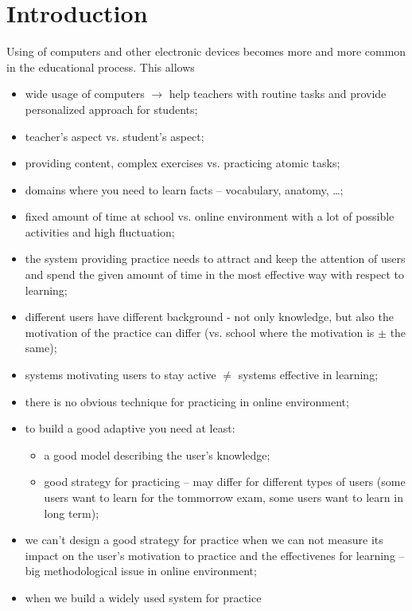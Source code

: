 \documentclass[table,color]{fithesis3/fithesis3}
\begin{document}
\chapter{Introduction}
Using of computers and other electronic devices becomes more and more common in
the educational process. This allows

\begin{itemize}
	\item	wide usage of computers $\rightarrow$ help teachers with routine tasks
				and provide personalized approach for students;
	\item	teacher's aspect vs. student's aspect;
	\item	providing content, complex exercises vs. practicing atomic tasks;
	\item	domains where you need to learn facts -- vocabulary, anatomy, \ldots;
	\item	fixed amount of time at school vs. online environment with a lot of
				possible activities and high fluctuation;
	\item	the system providing practice needs to attract and keep the attention
				of users and spend the given amount of time in the most effective way
				with respect to learning;
	\item	different users have different background - not only knowledge, but
				also the motivation of the practice can differ (vs. school where the
				motivation is $\pm$ the same);
	\item	systems motivating users to stay active $\neq$ systems effective in
				learning;
	\item	there is no obvious technique for practicing in online environment;
	\item	to build a good adaptive you need at least:
		\begin{itemize}
			\item	a good model describing the user's knowledge;
			\item	good strategy for practicing -- may differ for different types of
						users (some users want to learn for the tommorrow exam, some users want to
						learn in long term);
		\end{itemize}
	\item	we can't design a good strategy for practice when we can not measure
				its impact on the user's motivation to practice and the effectivenes for
				learning -- big methodological issue in online environment;
	\item	when we build a widely used system for practice
\end{itemize}
\end{document}
